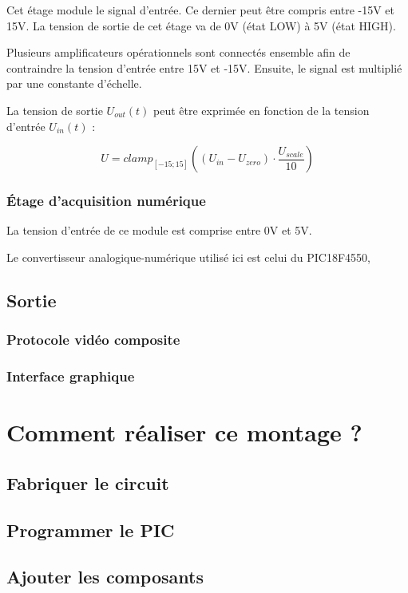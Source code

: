 \documentclass[11pt]{article}
\begin{document}
Cet étage module le signal d'entrée. Ce dernier peut être compris entre -15V et 15V. La tension de sortie de cet étage va de 0V (état LOW) à 5V (état HIGH).

Plusieurs amplificateurs opérationnels sont connectés ensemble afin de contraindre la tension d'entrée entre 15V et -15V. Ensuite, le signal est multiplié par une constante d'échelle.

La tension de sortie $U_{out}(t)$ peut être exprimée en fonction de la tension d'entrée $U_{in}(t)$ :

\[ U = clamp_{[-15;15]}((U_{in} - U_{zero}) \cdot \frac{U_{scale}}{10}) \]



\subsubsection{Étage d'acquisition numérique}

La tension d'entrée de ce module est comprise entre 0V et 5V.

Le convertisseur analogique-numérique utilisé ici est celui du PIC18F4550,

\subsection{Sortie}

\subsubsection{Protocole vidéo composite}

\subsubsection{Interface graphique}


\section {Comment réaliser ce montage ?}

\subsection{Fabriquer le circuit}

\subsection{Programmer le PIC}

\subsection{Ajouter les composants}
\end{document}
